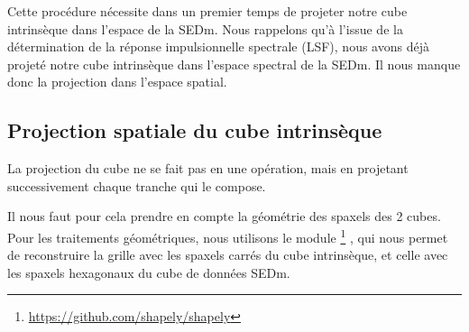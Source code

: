 \documentclass[../main/main.tex]{subfiles}
\begin{document}
Cette procédure nécessite dans un premier temps de projeter notre cube
intrinsèque dans l'espace de la SEDm. Nous rappelons qu'à l'issue de la
détermination de la réponse impulsionnelle spectrale (LSF), nous avons
déjà projeté notre cube intrinsèque dans l'espace spectral de la
SEDm. Il nous manque donc la projection dans l'espace spatial.

\subsection{Projection spatiale du cube intrinsèque}

La projection du cube ne se fait pas en une opération, mais en projetant
successivement chaque tranche qui le compose.

Il nous faut pour cela prendre en compte la géométrie des spaxels des 2
cubes. Pour les traitements géométriques, nous utilisons le module
\footnote{\url{https://github.com/shapely/shapely}} \citep{shapely2007}, qui
nous permet de reconstruire la grille avec les spaxels carrés du cube
intrinsèque, et celle avec les spaxels hexagonaux du cube de données
SEDm.
\end{document}

